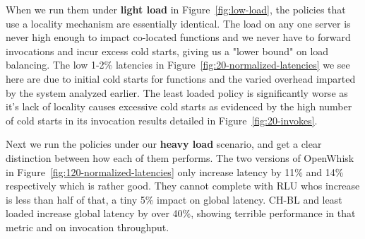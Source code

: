 





When we run them under \textbf{light load} in Figure~\ref{fig:low-load}, the policies that use a locality mechanism are essentially identical.
The load on any one server is never high enough to impact co-located functions and we never have to forward invocations and incur excess cold starts, giving us a "lower bound" on load balancing.
The low 1-2\% latencies in Figure~\ref{fig:20-normalized-latencies} we see here are due to initial cold starts for functions and the varied overhead imparted by the system analyzed earlier.
The least loaded policy is significantly worse as it's lack of locality causes excessive cold starts as evidenced by the high number of cold starts in its invocation results detailed in Figure~\ref{fig:20-invokes}.


Next we run the policies under our \textbf{heavy load} scenario, and get a clear distinction between how each of them performs. 
The two versions of OpenWhisk  in Figure~\ref{fig:120-normalized-latencies} only increase latency by 11\% and 14\% respectively which is rather good.
They cannot complete with RLU whos increase is less than half of that, a tiny 5\% impact on global latency.
CH-BL and least loaded increase global latency by over 40\%, showing terrible performance in that metric and on invocation throughput. 


